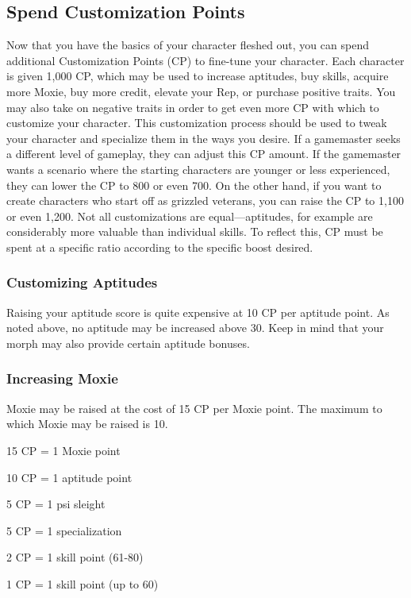 \subsection{Spend Customization Points}

Now that you have the basics of your character 
fleshed out, you can spend additional Customization
Points (CP) to fine-tune your character. Each
character is given 1,000 CP, which may be used to 
increase aptitudes, buy skills, acquire more Moxie, 
buy more credit, elevate your Rep, or purchase positive
traits. You may also take on negative traits in
order to get even more CP with which to customize 
your character. This customization process should be 
used to tweak your character and specialize them in 
the ways you desire.
If a gamemaster seeks a different level of gameplay, 
they can adjust this CP amount. If the gamemaster 
wants a scenario where the starting characters are 
younger or less experienced, they can lower the CP 
to 800 or even 700. On the other hand, if you want 
to create characters who start off as grizzled veterans, 
you can raise the CP to 1,100 or even 1,200.
Not all customizations are equal—aptitudes, for example
are considerably more valuable than individual
skills. To reflect this, CP must be spent at a specific 
ratio according to the specific boost desired.

\subsubsection{Customizing Aptitudes}

Raising your aptitude score is quite expensive at 10 
CP per aptitude point. As noted above, no aptitude 
may be increased above 30. Keep in mind that your 
morph may also provide certain aptitude bonuses.

\subsubsection{Increasing Moxie}

Moxie may be raised at the cost of 15 CP per Moxie 
point. The maximum to which Moxie may be raised 
is 10.

15 CP = 1 Moxie point

10 CP = 1 aptitude point

  5 CP = 1 psi sleight

  5 CP = 1 specialization

  2 CP = 1 skill point (61-80)

  1 CP = 1 skill point (up to 60)

